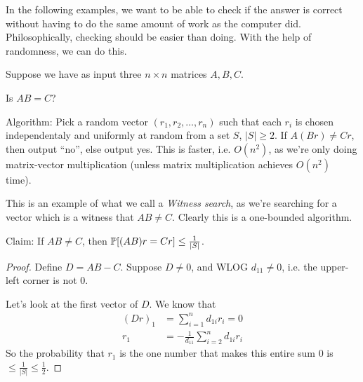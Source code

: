 \documentclass[11 pt]{scrartcl}
\begin{document}
In the following examples, we want to be able to check if the answer is correct without having to do the same amount of work as the computer did. Philosophically, checking should be easier than doing. With the help of randomness, we can do this.  
\begin{example}
    Suppose we have as input three $n\times n$ matrices $A,B,C$. 
    \begin{question}
        Is $AB = C$? 
    \end{question}
    Algorithm: Pick a random vector $(r_1, r_2, \dots, r_n)$ such that each $r_i$ is chosen independentaly and uniformly at random from a set $S$, $|S| \geq 2$. If $A(Br) \not= Cr$, then output ``no'', else output yes. This is faster, i.e. $O(n^2)$, as we're only doing matrix-vector multiplication (unless matrix multiplication achieves $O(n^2)$ time). 

    This is an example of what we call a \emph{Witness search}, as we're searching for a vector which is a witness that $AB \not= C$. Clearly this is a one-bounded algorithm. 

    Claim: If $AB \not= C$, then $\mathbb P[(AB)r = Cr] \leq \frac{1}{|S|}$. 
    \begin{proof}
        Define $D = AB - C$. Suppose $D \not= 0$, and WLOG $d_{11} \not= 0$, i.e. the upper-left corner is not 0. 

        Let's look at the first vector of $D$. We know that 
        \begin{align*}
            (Dr)_1 &= \sum_{i = 1}^n d_{1i}r_i = 0 \\ 
            r_1 &= -\frac{1}{d_{11}} \sum_{i = 2}^n  d_{1i} r_i
        \end{align*}
        So the probability that $r_1$ is the one number that makes this entire sum 0 is $\leq \frac{1}{|S|} \leq \frac{1}{2}$. 
    \end{proof}
\end{example}
\end{document}

